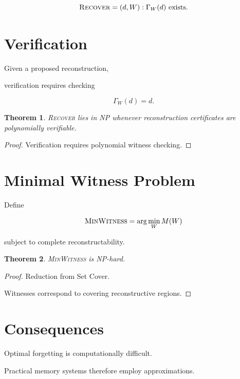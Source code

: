 \documentclass[12pt,oneside]{book}
\theoremstyle{plain} \newtheorem{theorem}{Theorem}[chapter] \newtheorem{lemma}[theorem]{Lemma} \newtheorem{proposition}[theorem]{Proposition} \newtheorem{corollary}[theorem]{Corollary}
\theoremstyle{definition} \newtheorem{definition}[theorem]{Definition} \newtheorem{axiom}[theorem]{Axiom} \newtheorem{construction}[theorem]{Construction}
\theoremstyle{remark} \newtheorem{remark}[theorem]{Remark} \newtheorem{example}[theorem]{Example}
\begin{document}
\[
\textsc{Recover}
=
{
(d,W):
\Gamma_W(d)
\text{ exists}
}.
\]

\section{Verification}

Given a proposed reconstruction,

verification requires checking

\[
\Gamma_W(d)=d.
\]

\begin{theorem}

\textsc{Recover}
lies in NP whenever reconstruction certificates are polynomially verifiable.

\end{theorem}

\begin{proof}

Verification requires polynomial witness checking.

\end{proof}

\section{Minimal Witness Problem}

Define

\[
\textsc{MinWitness}
=
\arg\min_W
M(W)
\]

subject to complete reconstructability.

\begin{theorem}

\textsc{MinWitness}
is NP-hard.

\end{theorem}

\begin{proof}

Reduction from Set Cover.

Witnesses correspond to covering reconstructive regions.

\end{proof}

\section{Consequences}

Optimal forgetting is computationally difficult.

Practical memory systems therefore employ approximations.
\end{document}
